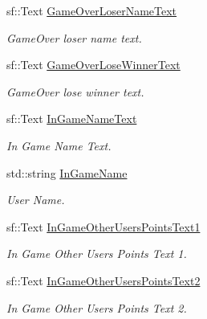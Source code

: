 \begin{DoxyCompactItemize}
\mbox{\label{class_scene_a3bb80209dbb364c2b214114e635f8c43}} 
sf\+::\+Text \hyperlink{class_scene_a3bb80209dbb364c2b214114e635f8c43}{Game\+Over\+Loser\+Name\+Text}
\begin{DoxyCompactList}\small\item\em Game\+Over loser name text. \end{DoxyCompactList}\item 
\mbox{\label{class_scene_ad5cd07426583868ba369b9e17b39bf07}} 
sf\+::\+Text \hyperlink{class_scene_ad5cd07426583868ba369b9e17b39bf07}{Game\+Over\+Lose\+Winner\+Text}
\begin{DoxyCompactList}\small\item\em Game\+Over lose winner text. \end{DoxyCompactList}\item 
\mbox{\label{class_scene_a5ab29d6ee8177b400174177a61169b5f}} 
sf\+::\+Text \hyperlink{class_scene_a5ab29d6ee8177b400174177a61169b5f}{In\+Game\+Name\+Text}
\begin{DoxyCompactList}\small\item\em In Game Name Text. \end{DoxyCompactList}\item 
\mbox{\label{class_scene_a933b81b9c2f1023cbc7a5a07e3f32fc7}} 
std\+::string \hyperlink{class_scene_a933b81b9c2f1023cbc7a5a07e3f32fc7}{In\+Game\+Name}
\begin{DoxyCompactList}\small\item\em User Name. \end{DoxyCompactList}\item 
\mbox{\label{class_scene_a6fdf0dc1fd4bc12c2bc8933f9e821d45}} 
sf\+::\+Text \hyperlink{class_scene_a6fdf0dc1fd4bc12c2bc8933f9e821d45}{In\+Game\+Other\+Users\+Points\+Text1}
\begin{DoxyCompactList}\small\item\em In Game Other Users Points Text 1. \end{DoxyCompactList}\item 
\mbox{\label{class_scene_aed6894b4cb258d6acf8f26d1242f4684}} 
sf\+::\+Text \hyperlink{class_scene_aed6894b4cb258d6acf8f26d1242f4684}{In\+Game\+Other\+Users\+Points\+Text2}
\begin{DoxyCompactList}\small\item\em In Game Other Users Points Text 2. \end{DoxyCompactList}\item 

\end{DoxyCompactItemize}
